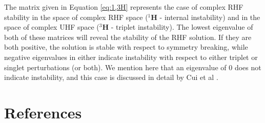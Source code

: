 \documentclass{revtex4}
\begin{document}
    The matrix given in Equation \ref{eq:1,3H} represents the case of complex RHF stability in the space of complex RHF space (${}^{1}\mathbf{H}$ - internal instability) and in the space of complex UHF space (${}^{3}\mathbf{H}$ - triplet instability). The lowest eigenvalue of both of these matrices will reveal the stability of the RHF solution. If they are both positive, the solution is stable with respect to symmetry breaking, while negative eigenvalues in either indicate instability with respect to either triplet or singlet perturbations (or both). We mention here that an eigenvalue of 0 does not indicate instability, and this case is discussed in detail by Cui et al \cite{Cui2013}.

\section{References}

\end{document}

